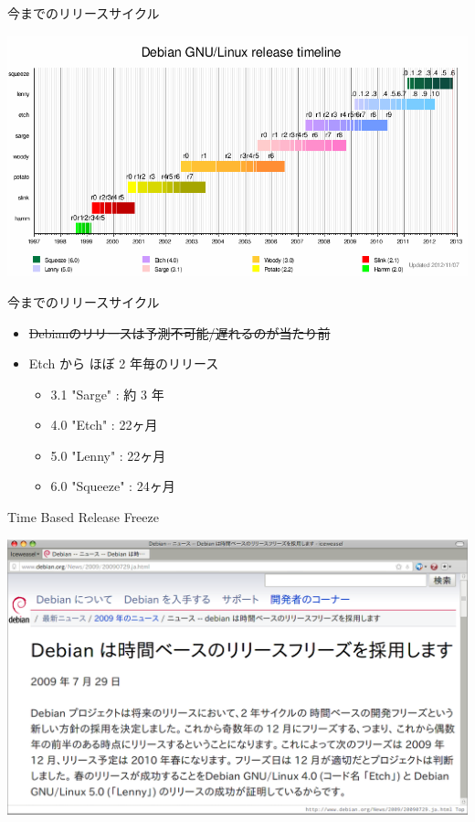 \documentclass[cjk,dvipdfmx,12pt,compress,%
hyperref={bookmarks=true,bookmarksnumbered=true,bookmarksopen=false,%
  colorlinks=false,%
  pdftitle={第 66 回 関西 Debian 勉強会@KOF2012},%
  pdfauthor={佐々木洋平},%
  pdfsubject={資料},%
}]{beamer}
\begin{document}
\begin{frame}{今までのリリースサイクル}

\begin{center}
  \includegraphics[width=1\textwidth]{image201211/timeline.png}
\end{center}

\end{frame}

\begin{frame}{今までのリリースサイクル}

\begin{itemize}
\item \sout{Debianのリリースは予測不可能/遅れるのが当たり前}
\item \alert{Etch から ほぼ 2 年毎のリリース}
  \begin{itemize}
  \item 3.1 "Sarge"   : 約 3 年
  \item 4.0 "Etch"    : 22ヶ月
  \item 5.0 "Lenny"   : 22ヶ月
  \item 6.0 "Squeeze" : 24ヶ月
  \end{itemize}
\end{itemize}
\end{frame}

\begin{frame}{Time Based Release Freeze}

\begin{center}
\includegraphics[width=1\hsize]{image201208/Debian_News_2009-07-29-TimeBasedReleaseFreeze.png}
\end{center}

\end{frame}
\end{document}
